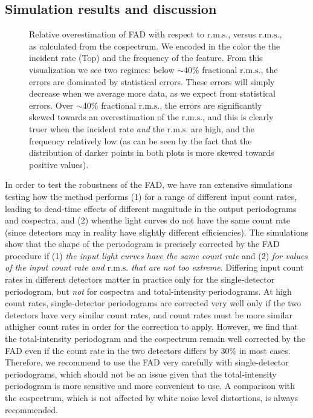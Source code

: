 \documentclass[twocolumn]{aastex61}
\newcommand{\rms}{\ensuremath{\mathrm{r.m.s.}}\xspace}
\begin{document}
\subsection{Simulation results and discussion}\label{sec:caveat}
\begin{figure*}
    \caption{Relative overestimation of FAD with respect to \rms, versus \rms, as calculated from the cospectrum.  
    We encoded in the color the  the incident rate (Top) and the frequency of the feature.
    From this visualization we see two regimes: below $\sim$40\% fractional \rms, the errors are dominated by statistical errors. 
    These errors will simply decrease when we average more data, as we expect from statistical errors.
    Over $\sim$40\% fractional \rms, the errors are significantly skewed towards an overestimation of the \rms, and this is 
    clearly truer when the incident rate \textit{and} the \rms are high, and the frequency relatively low (as can be seen by the fact that the distribution of darker points in both plots is more skewed towards positive values). }
    \label{fig:errors}
\end{figure*}

In order to test the robustness of the FAD, we have ran extensive simulations testing how the method performs (1) for a range of different input count rates, leading to dead-time effects of different magnitude in the output periodograms and cospectra, and (2) whenthe light curves do not have the same count rate (since detectors may in reality have slightly different efficiencies).
The simulations show that the shape of the periodogram is precisely corrected by the FAD procedure if (1) \textit{the input light curves have the same count rate} and (2) \textit{for values of the input count rate and \rms that are not too extreme}. Differing input count rates in different detectors matter in practice only for the single-detector periodogram, but \textit{not} for cospectra and total-intensity periodograms. 
At high count rates, single-detector periodograms are corrected very well only if the two detectors have very similar count rates, and count rates must be more similar athigher count rates in order for the correction to apply.
However, we find that the total-intensity periodogram and the cospectrum remain well corrected by the FAD even if the count rate in the two detectors differs by 30\% in most cases.
Therefore, we recommend to use the FAD very carefully with single-detector periodograms, which should not be an issue given that the total-intensity periodogram is more sensitive and more convenient to use. 
A comparison with the cospectrum, which is not affected by white noise level distortions, is always recommended. 
\end{document}
